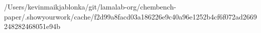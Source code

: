 /Users/kevinmaikjablonka/git/lamalab-org/chembench-paper/.showyourwork/cache/f2d99a8facd03a186226e9c40a96e1252b4cf6f072ad2669248282468051e94b